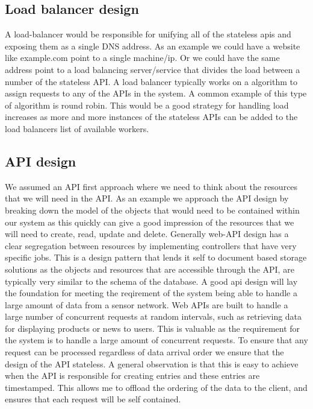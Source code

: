 \documentclass[]{uiophd}
\begin{document}
\subsection{Load balancer design}
A load-balancer would be responsible for unifying all of the stateless apis and exposing them as a single DNS address. As an example we could have a website like example.com point to a single machine/ip. Or we could have the same address point to a load balancing server/service that divides the load between a number of the stateless API. A load balancer typically works on a algorithm to assign requests to any of the APIs in the system. A common example of this type of algorithm is round robin. This would be a good strategy for handling load increases as more and more instances of the stateless APIs can be added to the load balancers list of available workers.

\subsection{API design}
We assumed an API first approach where we need to think about the resources that we will need in the API. As an example we approach the API design by breaking down the model of the objects that would need to be contained within our system as this quickly can give a good impression of the resources that we will need to create, read, update and delete. Generally web-API design has a clear segregation between resources by implementing controllers that have very specific jobs. This is a design pattern that lends it self to document based storage solutions as the objects and resources that are accessible through the API, are typically very similar to the schema of the database. A good api design will lay  the foundation for meeting the reqirement of the system being able to handle a large amount of data from a sensor network. Web APIs are built to handle a large number of concurrent requests at random intervals, such as retrieving data for displaying products or news to users. This is valuable as the requirement for the system is to handle a large amount of concurrent requests. To ensure that any request can be processed regardless of data arrival order we ensure that the design of the API stateless. A general observation is that this is easy to achieve when the API is responsible for creating entries and these entries are timestamped. This allows me to offload the ordering of the data to the client, and ensures that each request will be self contained.
\end{document}
